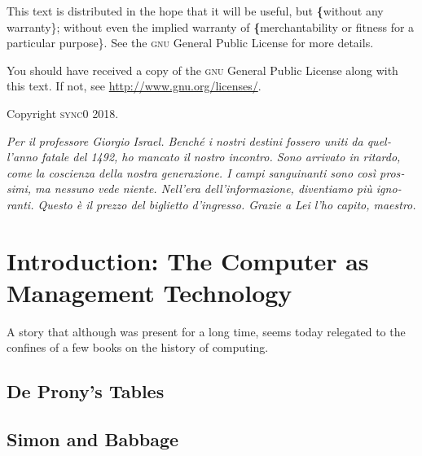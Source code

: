\documentclass[version=last,draft=false,paper=A4,portrait,twoside=true,twocolumn=false,headinclude=false,footinclude=false,fontsize=11,BCOR=15mm,DIV=calc,pagesize=auto,titlepage=firstiscover,mpinclude=true,open=right,chapterprefix=true,numbers=autoendperiod,headsepline=false,parskip=false]{scrreprt}
\begin{document}
This text is distributed in the hope that it will be useful, but \textbf\{without
any warranty\}; without even the implied warranty of \textbf\{merchantability or 
fitness for a particular purpose\}. See the \textsc{gnu} General 
Public License for more details.

You should have received a copy of the \textsc{gnu} General Public License along
with this text. If not, see \url{http://www.gnu.org/licenses/}.

\vspace{1\baselineskip}
\noindent
Copyright \textcopyright \textsc{sync0} 2018. 

\newpage 
\begin{FlushRight}
\begin{italian}
\textit{Per il professore Giorgio Israel. \newline Benché i nostri destini fossero uniti da quell'anno fatale del 1492, \linebreak ho mancato il nostro incontro. \linebreak Sono arrivato in ritardo, come la coscienza della nostra generazione. \linebreak I campi sanguinanti sono così prossimi, \linebreak ma nessuno vede niente. \linebreak Nell'era dell'informazione, diventiamo più ignoranti. \linebreak Questo è il prezzo del biglietto d'ingresso. \linebreak Grazie a Lei l'ho capito, maestro.}
\end{italian}
\end{FlushRight}

\newpage
\tableofcontents 

\pagestyle{plain}

\pagestyle{scrheadings}

\chapter{Introduction: The Computer as Management Technology}
\label{sec:org1435d05}
A story that although was present for a long time, seems today relegated to
the confines of a few books on the history of computing. 

\lipsum
\section{De Prony's Tables}
\label{sec:org3a51ca9}
\lipsum
\section{Simon and Babbage}
\label{sec:org9bb9bee}
\lipsum
\end{document}
